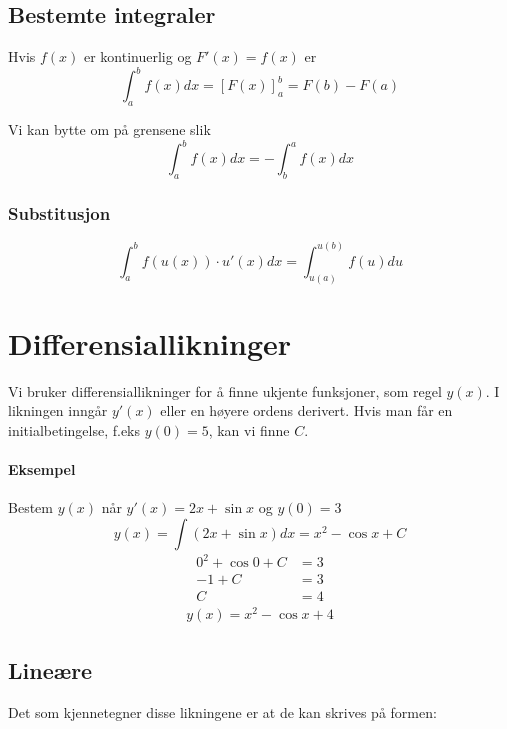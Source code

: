\documentclass[12pt,norsk,a4paper]{article}
\begin{document}

\subsection{Bestemte integraler}
Hvis $f(x)$ er kontinuerlig og $F'(x)=f(x)$ er
\begin{equation}
\int_a^b f(x) dx = [ F(x) ]_a^b = F(b) - F(a)
\end{equation}

Vi kan bytte om på grensene slik
\begin{equation}
\int_a^b f(x) dx = - \int_b^a f(x) dx
\end{equation}

\subsubsection*{Substitusjon}
\begin{equation}
\int_a^b f(u(x)) \cdot u'(x) dx = \int_{u(a)}^{u(b)} f(u) du
\end{equation}

\newpage
\section{Differensiallikninger}
Vi bruker differensiallikninger for å finne ukjente funksjoner, som regel $y(x)$. I likningen inngår $y'(x)$ eller en høyere ordens derivert. Hvis man får en initialbetingelse, f.eks $y(0) = 5$, kan vi finne $C$.

\paragraph*{Eksempel} Bestem $y(x)$ når $y'(x) = 2x + \sin x$ og $y(0) = 3$
\begin{equation*}
y(x) = \int (2x + \sin x) dx = x^2 - \cos x + C
\end{equation*}
\begin{align*}
0^2 + \cos 0 + C &= 3	\\
-1 + C &= 3				\\
C &= 4
\end{align*}
\begin{align*}
y(x) = x^2 - \cos x + 4
\end{align*}

\subsection{Lineære}
Det som kjennetegner disse likningene er at de kan skrives på formen:
\end{document}
